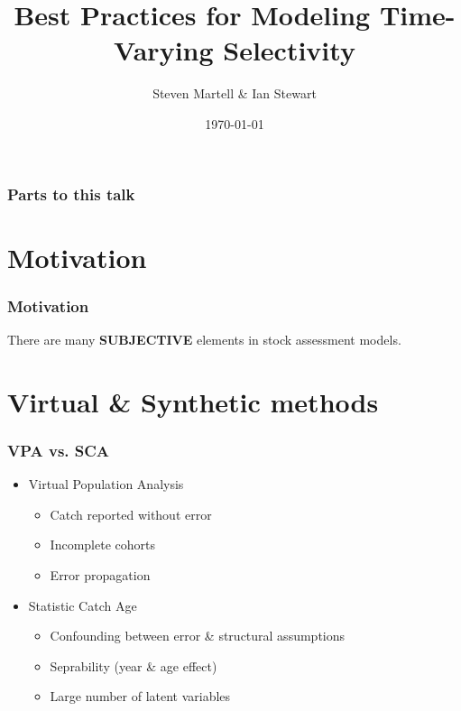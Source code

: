 \documentclass[table]{beamer}
\title[IPHC]{Best Practices for Modeling Time-Varying Selectivity}
\author[Martell \& Stewart]{Steven Martell \& Ian Stewart}
\institute[IPHC]
{
International Pacific Halibut Commission\\
\medskip
{\emph{stevem@iphc.int}}
}
\date{\today}
\begin{document}
%
\begin{frame}
\titlepage
\end{frame}
%
\begin{frame}[t]\frametitle{Parts to this talk}
    
\tableofcontents

\end{frame}

\section{Motivation} %
\label{sec:motivation}

\begin{frame}
\frametitle{Motivation}

	
\begin{center}
	There are many \textbf{SUBJECTIVE} elements in stock assessment models.
\end{center}

\end{frame}

\section{Virtual \& Synthetic methods} %
\label{sec:virtual_&_synthetic_methods}

\begin{frame}[m]\frametitle{VPA vs. SCA}

\begin{itemize}

	\item \alert<1>{Virtual Population Analysis}
		\begin{itemize}[<+->]
			\item Catch reported without error
			\item Incomplete cohorts
			\item Error propagation
		\end{itemize}
\vfill
	\item \alert<4>{Statistic Catch Age }
		\begin{itemize}[<+->]
			\item Confounding between error \& structural assumptions
			\item Seprability (year \& age effect)
			\item Large number of latent variables
		\end{itemize}
\end{itemize}
    


\end{frame}
\end{document}
